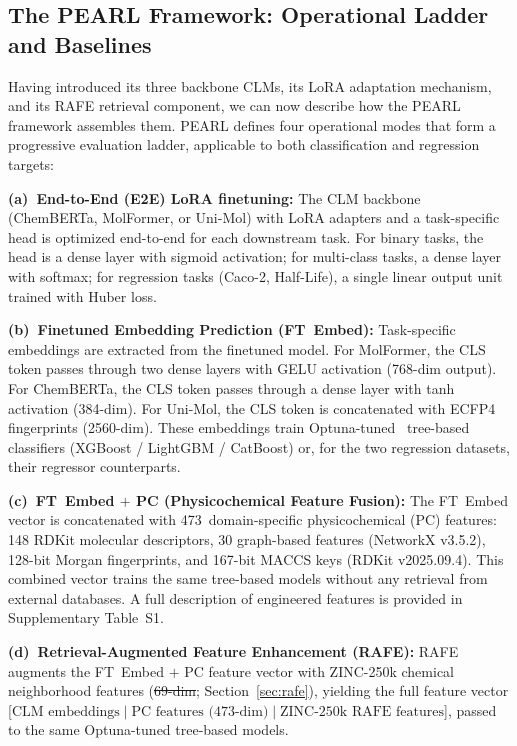 \documentclass[pdflatex,sn-mathphys-num,Numbered]{sn-jnl}%
\makeatletter
\providecommand{\DIFadd}[1]{{\protect\color{blue}\uwave{#1}}} %
\providecommand{\DIFdel}[1]{{\protect\color{red}\sout{#1}}} %
\providecommand{\DIFaddbegin}{} %
\providecommand{\DIFaddend}{} %
\providecommand{\DIFdelbegin}{} %
\providecommand{\DIFdelend}{} %
\providecommand{\DIFscaledelfig}{0.5}
\newlength{\DIFdelgraphicswidth} %
\newlength{\DIFdelgraphicsheight} %
\providecommand{\DIFaddincludegraphics}[2][]{{\color{blue}\fbox{\DIFOincludegraphics[#1]{#2}}}} %
\providecommand{\DIFdelincludegraphics}[2][]{%
\sbox{\DIFdelgraphicsbox}{\DIFOincludegraphics[#1]{#2}}%
\settoboxwidth{\DIFdelgraphicswidth}{\DIFdelgraphicsbox} %
\settoboxtotalheight{\DIFdelgraphicsheight}{\DIFdelgraphicsbox} %
\scalebox{\DIFscaledelfig}{%
\parbox[b]{\DIFdelgraphicswidth}{\usebox{\DIFdelgraphicsbox}\\[-\baselineskip] \rule{\DIFdelgraphicswidth}{0em}}\llap{\resizebox{\DIFdelgraphicswidth}{\DIFdelgraphicsheight}{%
\setlength{\unitlength}{\DIFdelgraphicswidth}%
\begin{picture}(1,1)%
\thicklines\linethickness{2pt} %
{\color[rgb]{1,0,0}\put(0,0){\framebox(1,1){}}}%
{\color[rgb]{1,0,0}\put(0,0){\line( 1,1){1}}}%
{\color[rgb]{1,0,0}\put(0,1){\line(1,-1){1}}}%
\end{picture}%
}\hspace*{3pt}}} %
} %
\DeclareRobustCommand{\DIFaddbegin}{\DIFOaddbegin \let\includegraphics\DIFaddincludegraphics} %
\DeclareRobustCommand{\DIFaddend}{\DIFOaddend \let\includegraphics\DIFOincludegraphics} %
\DeclareRobustCommand{\DIFdelbegin}{\DIFOdelbegin \let\includegraphics\DIFdelincludegraphics} %
\DeclareRobustCommand{\DIFdelend}{\DIFOaddend \let\includegraphics\DIFOincludegraphics} %
\let\sout@orig\sout %
\renewcommand{\sout}[1]{\ifmmode\text{\sout@orig{\ensuremath{#1}}}\else\sout@orig{#1}\fi} %
\makeatother
\begin{document}
\DIFdelend \subsection{The PEARL Framework: Operational Ladder and Baselines}\label{sec:pearl_ladder}
Having introduced its three backbone CLMs, its LoRA adaptation mechanism, and its RAFE retrieval component, we can now describe how the PEARL framework assembles them. PEARL defines four operational modes that form a progressive evaluation ladder, applicable to both classification and regression targets:

\textbf{(a)~End-to-End (E2E) LoRA finetuning:} The CLM backbone (ChemBERTa, MolFormer, or Uni-Mol) with LoRA adapters and a task-specific head is optimized end-to-end for each downstream task. For binary tasks, the head is a dense layer with sigmoid activation; for multi-class tasks, a dense layer with softmax; for regression tasks (Caco-2, Half-Life), a single linear output unit trained with Huber loss.

\textbf{(b)~Finetuned Embedding Prediction (FT~Embed):} Task-specific embeddings are extracted from the finetuned model. For MolFormer, the CLS token passes through two dense layers with GELU activation (768-dim output). For ChemBERTa, the CLS token passes through a dense layer with tanh activation (384-dim). For Uni-Mol, the CLS token is concatenated with ECFP4 fingerprints (2560-dim). These embeddings train Optuna-tuned~\cite{akiba2019optuna} tree-based classifiers (XGBoost / LightGBM / CatBoost) or, for the two regression datasets, their regressor counterparts.

\textbf{(c)~FT~Embed $+$ PC (Physicochemical Feature Fusion):} The FT~Embed vector is concatenated with 473~domain-specific physicochemical (PC) features: 148 RDKit molecular descriptors, 30 graph-based features (NetworkX v3.5.2), 128-bit Morgan fingerprints, and 167-bit MACCS keys (RDKit v2025.09.4). This combined vector trains the same tree-based models without any retrieval from external databases. A full description of engineered features is provided in Supplementary Table~S1.

\textbf{(d)~Retrieval-Augmented Feature Enhancement (RAFE):} RAFE augments the FT~Embed $+$ PC feature vector with ZINC-250k chemical neighborhood features (\DIFdelbegin \DIFdel{69-dim}\DIFdelend \DIFaddbegin \DIFadd{60-dim}\DIFaddend ; Section~\ref{sec:rafe}), yielding the full feature vector [$\text{CLM embeddings} \mid \text{PC features (473-dim)} \mid \text{ZINC-250k RAFE features}$], passed to the same Optuna-tuned tree-based models.
\end{document}
